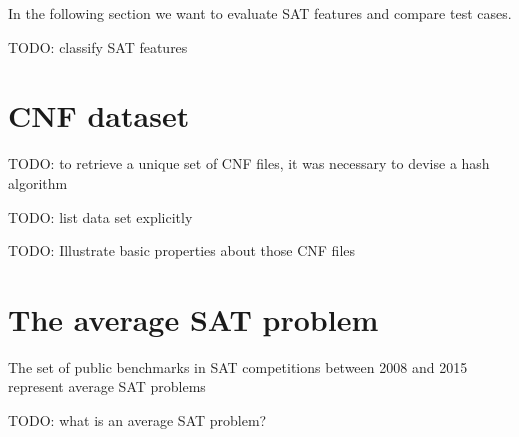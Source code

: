In the following section we want to evaluate SAT features and
compare test cases.

TODO: classify SAT features

\section{CNF dataset}
\label{sec:features-dataset}

TODO: to retrieve a unique set of CNF files, it was necessary to devise a hash algorithm

TODO: list data set explicitly

TODO: Illustrate basic properties about those CNF files


\section{The average SAT problem}
\label{sec:features-average}

\begin{prop}
  The set of public benchmarks in SAT competitions between 2008 and 2015
  represent average SAT problems
\end{prop}

TODO: what is an average SAT problem?

